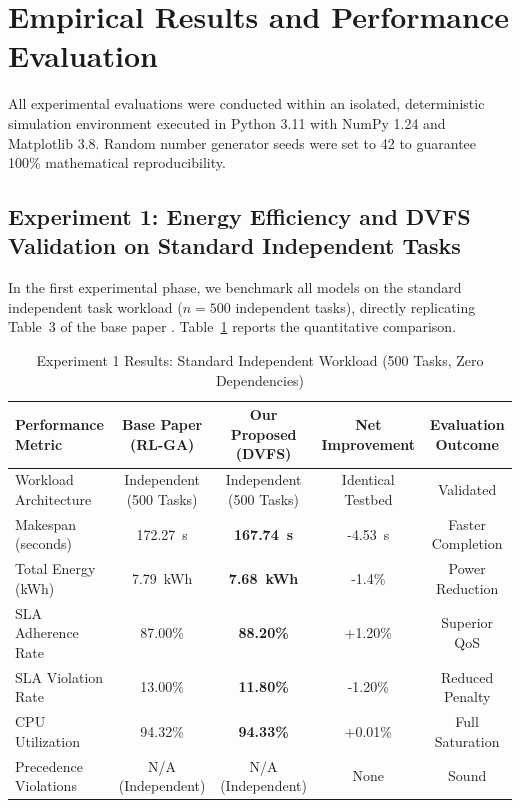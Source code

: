 \documentclass[default,sn-mathphys-num]{sn-jnl}
\theoremstyle{thmstyleone}
\theoremstyle{thmstyletwo}
\theoremstyle{thmstylethree}
\begin{document}
\section{Empirical Results and Performance Evaluation}\label{sec:results}

All experimental evaluations were conducted within an isolated, deterministic simulation environment executed in Python 3.11 with NumPy 1.24 and Matplotlib 3.8. Random number generator seeds were set to 42 to guarantee 100\% mathematical reproducibility.

\subsection{Experiment 1: Energy Efficiency and DVFS Validation on Standard Independent Tasks}
In the first experimental phase, we benchmark all models on the standard independent task workload ($n = 500$ independent tasks), directly replicating Table~3 of the base paper \cite{narsimhulu2026hybrid}. Table~\ref{tab:exp1_results} reports the quantitative comparison.

\begin{table}[t]
\caption{Experiment 1 Results: Standard Independent Workload (500 Tasks, Zero Dependencies)}\label{tab:exp1_results}
\centering
\small
\begin{tabular}{lcccc}
\toprule
\textbf{Performance Metric} & \textbf{Base Paper (RL-GA)} & \textbf{Our Proposed (DVFS)} & \textbf{Net Improvement} & \textbf{Evaluation Outcome} \\
\midrule
Workload Architecture & Independent (500 Tasks) & Independent (500 Tasks) & Identical Testbed & Validated \\
Makespan (seconds) & 172.27~s & \textbf{167.74~s} & -4.53~s & Faster Completion \\
Total Energy (kWh) & 7.79~kWh & \textbf{7.68~kWh} & -1.4\% & Power Reduction \\
SLA Adherence Rate & 87.00\% & \textbf{88.20\%} & +1.20\% & Superior QoS \\
SLA Violation Rate & 13.00\% & \textbf{11.80\%} & -1.20\% & Reduced Penalty \\
CPU Utilization & 94.32\% & \textbf{94.33\%} & +0.01\% & Full Saturation \\
Precedence Violations & N/A (Independent) & N/A (Independent) & None & Sound \\
\bottomrule
\end{tabular}
\end{table}
\end{document}
